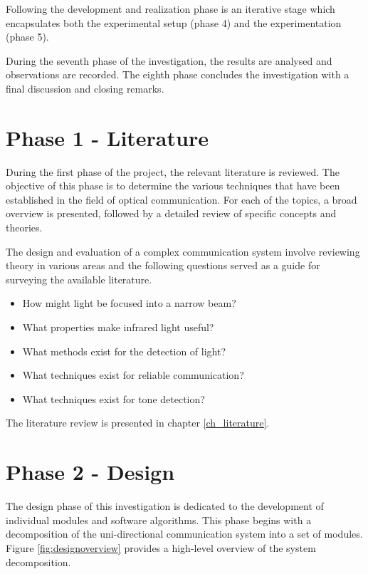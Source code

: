 Following the development and realization phase is an iterative stage which encapsulates both the experimental setup (phase 4) and the experimentation (phase 5).

During the seventh phase of the investigation, the results are analysed and observations are recorded. The eighth phase concludes the investigation with a final discussion and closing remarks.


\section{Phase 1 - Literature}

During the first phase of the project, the relevant literature is reviewed. The objective of this phase is to determine the various techniques that have been established in the field of optical communication. For each of the topics, a broad overview is presented, followed by a detailed review of specific concepts and theories.

The design and evaluation of a complex communication system involve reviewing theory in various areas and the following questions served as a guide for surveying the available literature.

\begin{itemize}
	\item How might light be focused into a narrow beam? %
	\item What properties make infrared light useful? %
	\item What methods exist for the detection of light? %
	\item What techniques exist for reliable communication? %
	\item What techniques exist for tone detection? %
\end{itemize}

The literature review is presented in chapter \ref{ch_literature}.


\section{Phase 2 - Design}

The design phase of this investigation is dedicated to the development of individual modules and software algorithms. This phase begins with a decomposition of the uni-directional communication system into a set of modules. Figure \ref{fig:designoverview} provides a high-level overview of the system decomposition.


